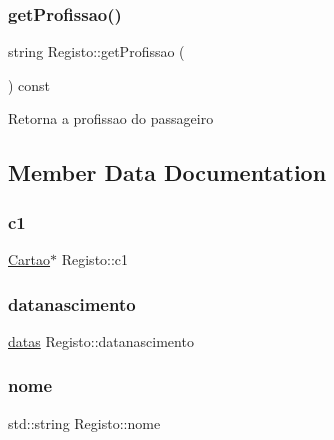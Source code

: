\subsubsection{\texorpdfstring{get\+Profissao()}{getProfissao()}}
{\footnotesize\ttfamily string Registo\+::get\+Profissao (\begin{DoxyParamCaption}{ }\end{DoxyParamCaption}) const}

Retorna a profissao do passageiro 

\subsection{Member Data Documentation}
\mbox{\label{class_registo_a081486fcc65a8696797eae018b89ab59}} 
\subsubsection{\texorpdfstring{c1}{c1}}
{\footnotesize\ttfamily \mbox{\hyperlink{class_cartao}{Cartao}}$\ast$ Registo\+::c1\hspace{0.3cm}{\ttfamily [private]}}

\mbox{\label{class_registo_ab95310053ffb7e2a07e45de4b3e8d62f}} 
\subsubsection{\texorpdfstring{datanascimento}{datanascimento}}
{\footnotesize\ttfamily \mbox{\hyperlink{structdatas}{datas}} Registo\+::datanascimento\hspace{0.3cm}{\ttfamily [private]}}

\mbox{\label{class_registo_a5f387f6835765cfebc7c292c8ca152dd}} 
\subsubsection{\texorpdfstring{nome}{nome}}
{\footnotesize\ttfamily std\+::string Registo\+::nome\hspace{0.3cm}{\ttfamily [private]}}

\mbox{\label{class_registo_aff4608d0155c0e50fbe8d2db6bdc8ec2}} 
